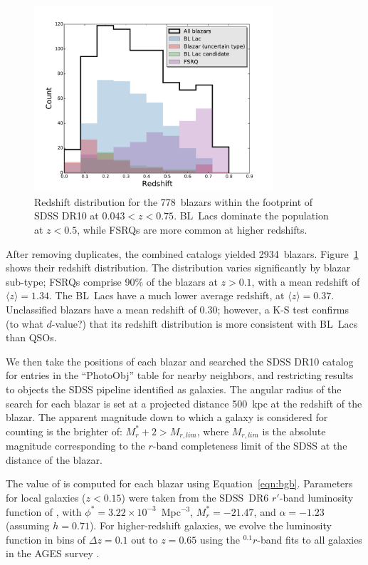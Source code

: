 \documentclass{emulateapj}
\begin{document}
\begin{figure}
\includegraphics[width=3.5in]{figures/blazars_zhist.pdf}
\caption{Redshift distribution for the 778~blazars within the footprint of SDSS DR10 at $0.043<z<0.75$. BL~Lacs dominate the population at $z<0.5$, while FSRQs are more common at higher redshifts. 
\label{fig:blazar_zhist}}
\end{figure}

After removing duplicates, the combined catalogs yielded 2934~blazars. Figure~\ref{fig:blazar_zhist} shows their redshift distribution. The distribution varies significantly by blazar sub-type; FSRQs comprise 90\% of the blazars at $z>0.1$, with a mean redshift of $\langle z\rangle=1.34$. The BL~Lacs have a much lower average redshift, at $\langle z\rangle=0.37$. Unclassified blazars \citep[``QSO candidates'', as defined by][]{mas09} have a mean redshift of $0.30$; however, a K-S test confirms {\note (to what $d$-value?)} that its redshift distribution is more consistent with BL~Lacs than QSOs. 

We then take the positions of each blazar and searched the SDSS DR10 catalog \citep{ahn14} for entries in the ``PhotoObj'' table for nearby neighbors, and restricting results to objects the SDSS pipeline identified as galaxies. The angular radius of the search for each blazar is set at a projected distance 500~kpc at the redshift of the blazar. The apparent magnitude down to which a galaxy is considered for counting is the brighter of: $M_r^* + 2 > M_{r,lim}$, where $M_{r,lim}$ is the absolute magnitude corresponding to the $r$-band completeness limit of the SDSS at the distance of the blazar. 

The value of \bgb{} is computed for each blazar using Equation~\ref{eqn:bgb}. Parameters for local galaxies ($z<0.15$) were taken from the SDSS~DR6 $r'$-band luminosity function of \citet{mon09a}, with $\phi^*=3.22\times10^{-3}$~Mpc$^{-3}$, $M_r^*=-21.47$, and $\alpha=-1.23$ (assuming $h=0.71$). For higher-redshift galaxies, we evolve the luminosity function in bins of $\Delta z=0.1$ out to $z=0.65$ using the $^{0.1}r$-band fits to all galaxies in the AGES survey \citep{coo12}. 
\end{document}
